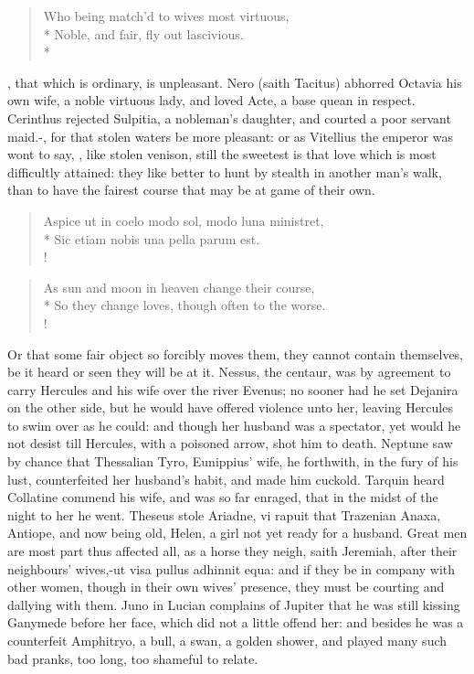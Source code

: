 \begin{verse}%
Who being match'd to wives most virtuous,\\*
Noble, and fair, fly out lascivious.\\*
\end{verse}%
%

, that which is ordinary, is unpleasant. Nero
(saith Tacitus) abhorred Octavia his own wife, a noble virtuous lady,
and loved Acte, a base quean in respect. Cerinthus rejected
Sulpitia, a nobleman's daughter, and courted a poor servant maid.-, for that stolen waters be more
pleasant: or as Vitellius the emperor was wont to say, , like stolen venison, still the
sweetest is that love which is most difficultly attained: they like
better to hunt by stealth in another man's walk, than to have the
fairest course that may be at game of their own.
%
\begin{latin}
\begin{verse}%
Aspice ut in coelo modo sol, modo luna ministret,\\*
Sic etiam nobis una pella parum est.\\!
\end{verse}%
\end{latin}
\translationrule%
\begin{verse}%
As sun and moon in heaven change their course,\\*
So they change loves, though often to the worse.\\!
\end{verse}%
%

Or that some fair object so forcibly moves them, they cannot contain
themselves, be it heard or seen they will be at it. Nessus, the
centaur, was by agreement to carry Hercules and his wife over the river
Evenus; no sooner had he set Dejanira on the other side, but he would
have offered violence unto her, leaving Hercules to swim over as he
could: and though her husband was a spectator, yet would he not desist
till Hercules, with a poisoned arrow, shot him to death. Neptune
saw by chance that Thessalian Tyro, Eunippius' wife, he forthwith, in
the fury of his lust, counterfeited her husband's habit, and made him
cuckold. Tarquin heard Collatine commend his wife, and was so far
enraged, that in the midst of the night to her he went. Theseus
stole Ariadne, vi rapuit that Trazenian Anaxa, Antiope, and now being
old, Helen, a girl not yet ready for a husband. Great men are most part
thus affected all, as a horse they neigh, saith Jeremiah, after
their neighbours' wives,-ut visa pullus adhinnit equa: and if they be
in company with other women, though in their own wives' presence, they
must be courting and dallying with them. Juno in Lucian complains of
Jupiter that he was still kissing Ganymede before her face, which did
not a little offend her: and besides he was a counterfeit Amphitryo, a
bull, a swan, a golden shower, and played many such bad pranks, too
long, too shameful to relate.


